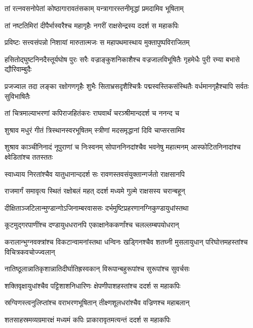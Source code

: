 \twolineshloka
{तां रत्नवसनोपेतां कोष्ठागारावतंसकाम्}
{यन्त्रागारस्तनीमृद्धां प्रमदामिव भूषिताम्} %

\twolineshloka
{तां नष्टतिमिरां दीपैर्भास्वरैश्च महागृहैः}
{नगरीं राक्षसेन्द्रस्य ददर्श स महाकपिः} %

\twolineshloka
{प्रविष्टः सत्त्वसंपन्नो निशायां मारुतात्मजः}
{स महापथमास्थाय मुक्तापुष्पविराजितम्} %

\threelineshloka
{हसितोद्घुष्टनिनदैस्तूर्यघोष पुरः सरैः}
{वज्राङ्कुशनिकाशैश्च वज्रजालविभूषितैः}
{गृहमेधैः पुरी रम्या बभासे द्यौरिवाम्बुदैः} %

\threelineshloka
{प्रजज्वाल तदा लङ्का रक्षोगणगृहैः शुभैः}
{सिताभ्रसदृशैश्चित्रैः पद्मस्वस्तिकसंस्थितैः}
{वर्धमानगृहैश्चापि सर्वतः सुविभाषितैः} %

\twolineshloka
{तां चित्रमाल्याभरणां कपिराजहितंकरः}
{राघवार्थं चरञ्श्रीमान्ददर्श च ननन्द च} %

\twolineshloka
{शुश्राव मधुरं गीतं त्रिस्थानस्वरभूषितम्}
{स्त्रीणां मदसमृद्धानां दिवि चाप्सरसामिव} %

\threelineshloka
{शुश्राव काञ्चीनिनादं नूपुराणां च निःस्वनम्}
{सोपाननिनदांश्चैव भवनेषु महात्मनम्}
{आस्फोटितनिनादांश्च क्ष्वेडितांश्च ततस्ततः} %

\twolineshloka
{स्वाध्याय निरतांश्चैव यातुधानान्ददर्श सः}
{रावणस्तवसंयुक्तान्गर्जतो राक्षसानपि} %

\twolineshloka
{राजमार्गं समावृत्य स्थितं रक्षोबलं महत्}
{ददर्श मध्यमे गुल्मे राक्षसस्य चरान्बहून्} %

\twolineshloka
{दीक्षिताञ्जटिलान्मुण्डान्गोऽजिनाम्बरवाससः}
{दर्भमुष्टिप्रहरणानग्निकुण्डायुधांस्तथा} %

\twolineshloka
{कूटमुद्गरपाणींश्च दण्डायुधधरानपि}
{एकाक्षानेककर्णांश्च चलल्लम्बपयोधरान्} %

\threelineshloka
{करालान्भुग्नवक्त्रांश्च विकटान्वामनांस्तथा}
{धन्विनः खड्गिनश्चैव शतघ्नी मुसलायुधान्}
{परिघोत्तमहस्तांश्च विचित्रकवचोज्ज्वलान्} %

\twolineshloka
{नातिष्ठूलान्नातिकृशान्नातिदीर्घातिह्रस्वकान्}
{विरूपान्बहुरूपांश्च सुरूपांश्च सुवर्चसः} %

\twolineshloka
{शक्तिवृक्षायुधांश्चैव पट्टिशाशनिधारिणः}
{क्षेपणीपाशहस्तांश्च ददर्श स महाकपिः} %

\twolineshloka
{स्रग्विणस्त्वनुलिप्तांश्च वराभरणभूषितान्}
{तीक्ष्णशूलधरांश्चैव वज्रिणश्च महाबलान्} %

\twolineshloka
{शतसाहस्रमव्यग्रमारक्षं मध्यमं कपिः}
{प्राकारावृतमत्यन्तं ददर्श स महाकपिः} %

